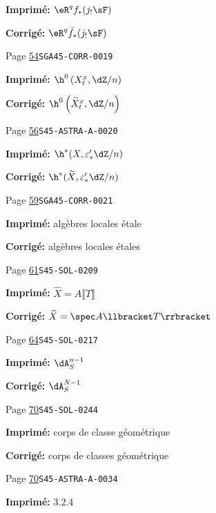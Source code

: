 \begin{description}
\par\noindent\textbf{Imprimé:} \(\eR^q f_*(j_! \sF)\)
\par\noindent\textbf{Corrigé:} \(\eR^q \bar f_*(j_! \sF)\)
\smallskip
\item[\hypertarget{apparatus:FR-0023}{23}] Page \hyperlink{printpage:fr:54}{54}\quad\texttt{SGA45-CORR-0019}
\par\noindent\textbf{Imprimé:} \(\h^0\left(X_t^x,\dZ/n\right)\)
\par\noindent\textbf{Corrigé:} \(\h^0\left(\widetilde X_t^x,\dZ/n\right)\)
\smallskip
\item[\hypertarget{apparatus:FR-0024}{24}] Page \hyperlink{printpage:fr:56}{56}\quad\texttt{S45-ASTRA-A-0020}
\par\noindent\textbf{Imprimé:} \(\h^*(X,\varepsilon_*' \dZ/n)\)
\par\noindent\textbf{Corrigé:} \(\h^*(\widetilde X,\varepsilon_*' \dZ/n)\)
\smallskip
\item[\hypertarget{apparatus:FR-0025}{25}] Page \hyperlink{printpage:fr:59}{59}\quad\texttt{SGA45-CORR-0021}
\par\noindent\textbf{Imprimé:} algèbres locales étale
\par\noindent\textbf{Corrigé:} algèbres locales étales
\smallskip
\item[\hypertarget{apparatus:FR-0026}{26}] Page \hyperlink{printpage:fr:61}{61}\quad\texttt{S45-SOL-0209}
\par\noindent\textbf{Imprimé:} \(\widehat X=A\llbracket T\rrbracket\)
\par\noindent\textbf{Corrigé:} \(\widehat X=\spec A\llbracket T\rrbracket\)
\smallskip
\item[\hypertarget{apparatus:FR-0027}{27}] Page \hyperlink{printpage:fr:64}{64}\quad\texttt{S45-SOL-0217}
\par\noindent\textbf{Imprimé:} \(\dA_S^{n-1}\)
\par\noindent\textbf{Corrigé:} \(\dA_S^{N-1}\)
\smallskip
\item[\hypertarget{apparatus:FR-0028}{28}] Page \hyperlink{printpage:fr:70}{70}\quad\texttt{S45-SOL-0244}
\par\noindent\textbf{Imprimé:} corps de classe géométrique
\par\noindent\textbf{Corrigé:} corps de classes géométrique
\smallskip
\item[\hypertarget{apparatus:FR-0029}{29}] Page \hyperlink{printpage:fr:70}{70}\quad\texttt{S45-ASTRA-A-0034}
\par\noindent\textbf{Imprimé:} 3.2.4

\end{description}
